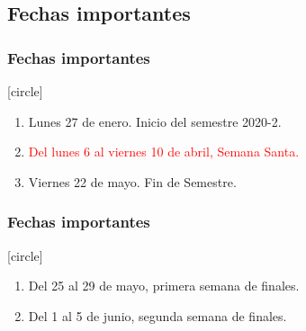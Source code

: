 \subsection{Fechas importantes}
\begin{frame}
\frametitle{Fechas importantes}
[circle]
\begin{enumerate}[<+->]
\item Lunes 27 de enero. Inicio del semestre 2020-2.
\item \textcolor{red}{Del lunes 6 al viernes 10 de abril, Semana Santa.}
\item Viernes 22 de mayo. Fin de Semestre.
\seti
\end{enumerate}
\end{frame}
\begin{frame}
\frametitle{Fechas importantes}
[circle]
\begin{enumerate}[<+->]
\conti
\item Del 25 al 29 de mayo, primera semana de finales.
\item Del 1 al 5 de junio, segunda semana de finales.
\end{enumerate}
\end{frame}
